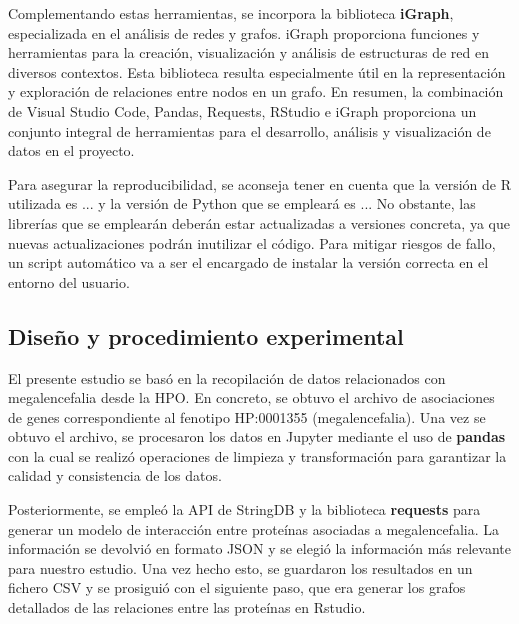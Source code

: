 Complementando estas herramientas, se incorpora la biblioteca \textbf{iGraph}, especializada en el análisis de redes y grafos. iGraph proporciona funciones y herramientas para la creación, visualización y análisis de estructuras de red en diversos contextos. Esta biblioteca resulta especialmente útil en la representación y exploración de relaciones entre nodos en un grafo. En resumen, la combinación de Visual Studio Code, Pandas, Requests, RStudio e iGraph proporciona un conjunto integral de herramientas para el desarrollo, análisis y visualización de datos en el proyecto.



Para asegurar la reproducibilidad, se aconseja tener en cuenta que la versión de R utilizada es ... y la versión de Python que se empleará es ... No obstante, las librerías que se emplearán deberán estar actualizadas a versiones concreta, ya que nuevas actualizaciones podrán inutilizar el código. Para mitigar riesgos de fallo, un script automático va a ser el encargado de instalar la versión correcta en el entorno del usuario.

\subsection{Diseño y procedimiento experimental}
El presente estudio se basó en la recopilación de datos relacionados con megalencefalia desde la HPO. En concreto, se obtuvo el archivo de asociaciones de genes correspondiente al fenotipo HP:0001355 (megalencefalia). Una vez se obtuvo el archivo, se procesaron los datos en Jupyter mediante el uso de \textbf{pandas} con la cual se realizó operaciones de limpieza y transformación para garantizar la calidad y consistencia de los datos. 

Posteriormente, se empleó la API de StringDB y la biblioteca \textbf{requests} para generar un modelo de interacción entre proteínas asociadas a megalencefalia. La información se devolvió en formato JSON y se elegió la información más relevante para nuestro estudio. Una vez hecho esto, se guardaron los resultados en un fichero CSV y se prosiguió con el siguiente paso, que era generar los grafos detallados de las relaciones entre las proteínas en Rstudio. \\

